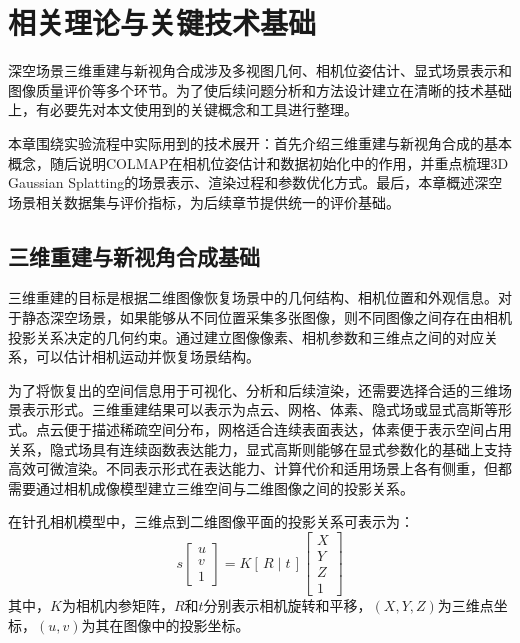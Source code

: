 
\chapter{相关理论与关键技术基础}

深空场景三维重建与新视角合成涉及多视图几何、相机位姿估计、显式场景表示和图像质量评价等多个环节。为了使后续问题分析和方法设计建立在清晰的技术基础上，有必要先对本文使用到的关键概念和工具进行整理。

本章围绕实验流程中实际用到的技术展开：首先介绍三维重建与新视角合成的基本概念，随后说明COLMAP在相机位姿估计和数据初始化中的作用，并重点梳理3D Gaussian Splatting的场景表示、渲染过程和参数优化方式。最后，本章概述深空场景相关数据集与评价指标，为后续章节提供统一的评价基础。

\section{三维重建与新视角合成基础}
三维重建的目标是根据二维图像恢复场景中的几何结构、相机位置和外观信息。对于静态深空场景，如果能够从不同位置采集多张图像，则不同图像之间存在由相机投影关系决定的几何约束。通过建立图像像素、相机参数和三维点之间的对应关系，可以估计相机运动并恢复场景结构。

为了将恢复出的空间信息用于可视化、分析和后续渲染，还需要选择合适的三维场景表示形式。三维重建结果可以表示为点云、网格、体素、隐式场或显式高斯等形式。点云便于描述稀疏空间分布，网格适合连续表面表达，体素便于表示空间占用关系，隐式场具有连续函数表达能力，显式高斯则能够在显式参数化的基础上支持高效可微渲染。不同表示形式在表达能力、计算代价和适用场景上各有侧重，但都需要通过相机成像模型建立三维空间与二维图像之间的投影关系。

在针孔相机模型中，三维点到二维图像平面的投影关系可表示为：
\begin{equation}
    s\left[\begin{smallmatrix}u\\v\\1\end{smallmatrix}\right]=K\left[\,R\mid t\,\right]\left[\begin{smallmatrix}X\\Y\\Z\\1\end{smallmatrix}\right]
\end{equation}
其中，$K$为相机内参矩阵，$R$和$t$分别表示相机旋转和平移，$(X,Y,Z)$为三维点坐标，$(u,v)$为其在图像中的投影坐标。

